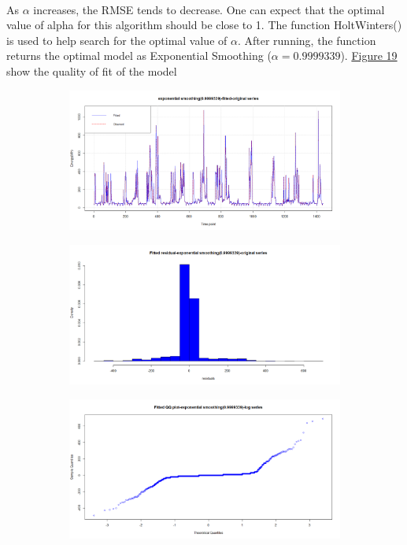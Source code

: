 \documentclass[12pt]{article}
\begin{document}
\paragraph{}
As $\alpha$ increases, the RMSE tends to decrease. One can expect that the optimal value of alpha for this algorithm should be close to 1. The function HoltWinters() is used to help search for the optimal value of $\alpha$. After running, the function returns the optimal model as Exponential Smoothing ($\alpha=0.9999339$). \href{figure19}{Figure 19} show the quality of fit of the model 
\begin{figure}[H]
  \centering
  \begin{subfigure}[b]{0.49\linewidth}
    \includegraphics[width=\linewidth]{figure19-1.png}
  \end{subfigure}
  \begin{subfigure}[b]{0.49\linewidth}
    \includegraphics[width=\linewidth]{figure19-2.png}
  \end{subfigure}
  \begin{subfigure}[b]{0.49\linewidth}
    \includegraphics[width=\linewidth]{figure19-3.png}

\end{subfigure}
\end{figure}
\end{document}
